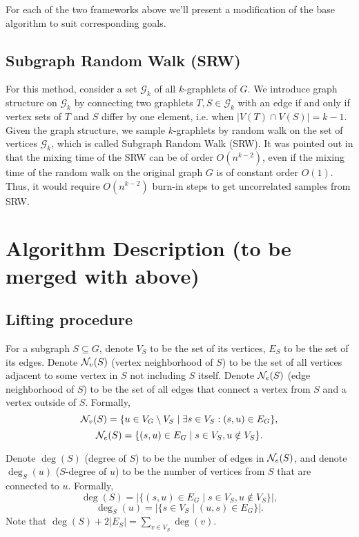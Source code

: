 	For each of the two frameworks above we'll present a modification of the base algorithm
	to suit corresponding goals.
	
	\subsection{Subgraph Random Walk (SRW)}
	For this method, consider a set $\mathcal{G}_k$ of all $k$-graphlets of $G$.
	We introduce graph structure on $\mathcal{G}_k$ by connecting two graphlets $T,S \in \mathcal{G}_k$ with an edge if and only if vertex sets of $T$ and $S$ differ by one element, i.e. when $|V(T) \cap V(S)| = k-1$.
	Given the graph structure, we sample $k$-graphlets by random walk on the set of vertices $\mathcal{G}_k$, which is called Subgraph Random Walk (SRW).
	It was pointed out in \cite{Bressan2017colourcoding} that the mixing time of the SRW can be of order $O(n^{k-2})$, even if the mixing time of the random walk on the original graph $G$ is of constant order $O(1)$.
	Thus, it would require $O(n^{k-2})$ burn-in steps to get uncorrelated samples from SRW.
		
	
	\section{Algorithm Description (to be merged with above)}
	\subsection{Lifting procedure}
	
	For a subgraph $S \subseteq G$, denote $V_S$ to be the set of its vertices, $E_S$ to be the set of its edges.
	Denote $\mathcal{N}_v(S)$ (vertex neighborhood of $S$) to be the set of all vertices adjacent to some vertex in $S$ not including $S$ itself. 
	Denote $\mathcal{N}_e(S)$ (edge neighborhood of $S$) to be the set of all edges that connect a vertex from $S$ and a vertex outside of $S$.
	Formally,
	\begin{equation*}
		\mathcal{N}_v(S) = \{u\in V_G\setminus V_S \mid \exists s\in V_S : (s,u)\in E_G\},
	\end{equation*}
	\begin{equation*}
		\mathcal{N}_e(S) = \{(s,u)\in E_G \mid s\in V_S, u\notin V_S\}.
	\end{equation*}	
	
	Denote $\deg(S)$ (degree of $S$) to be the number of edges in $\mathcal{N}_e(S)$, and denote $\deg_S(u)$ ($S$-degree of $u$) to be the number of vertices from $S$ that are connected to $u$.
	Formally,
	\begin{equation*}
		\deg(S) = |\{(s,u)\in E_G \mid s\in V_S, u\notin V_S\}|,
	\end{equation*}
	\begin{equation*}
		\deg_S(u) = |\{s\in V_S\mid (u,s)\in E_G\}|.
	\end{equation*}
	Note that $\deg(S) + 2|E_S| = \sum_{v\in V_S} \deg(v)$.
	
